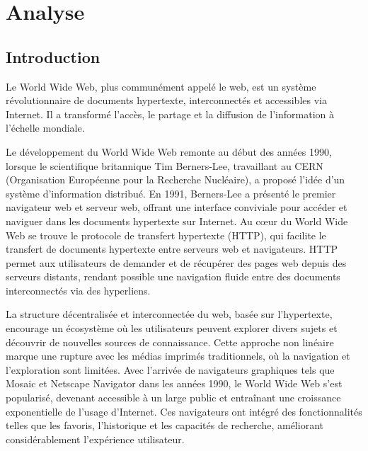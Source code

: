 \documentclass[a4paper,12pt]{article}
\begin{document}
\printbibliography

\section{Analyse}

\subsection{Introduction}
Le World Wide Web, plus communément appelé le web, est un système révolutionnaire de
documents hypertexte, interconnectés et accessibles via Internet. Il a transformé l'accès,
le partage et la diffusion de l'information à l'échelle mondiale.

Le développement du World Wide Web remonte au début des années 1990, lorsque le
scientifique britannique Tim Berners-Lee, travaillant au CERN (Organisation Européenne
pour la Recherche Nucléaire), a proposé l'idée d'un système d'information distribué. En
1991, Berners-Lee a présenté le premier navigateur web et serveur web, offrant une
interface conviviale pour accéder et naviguer dans les documents hypertexte sur Internet.
Au cœur du World Wide Web se trouve le protocole de transfert hypertexte (HTTP), qui
facilite le transfert de documents hypertexte entre serveurs web et navigateurs. HTTP
permet aux utilisateurs de demander et de récupérer des pages web depuis des serveurs
distants, rendant possible une navigation fluide entre des documents interconnectés via
des hyperliens.

La structure décentralisée et interconnectée du web, basée sur l'hypertexte, encourage un
écosystème où les utilisateurs peuvent explorer divers sujets et découvrir de nouvelles
sources de connaissance. Cette approche non linéaire marque une rupture avec les
médias imprimés traditionnels, où la navigation et l'exploration sont limitées.
Avec l'arrivée de navigateurs graphiques tels que Mosaic et Netscape Navigator dans les
années 1990, le World Wide Web s'est popularisé, devenant accessible à un large public
et entraînant une croissance exponentielle de l'usage d'Internet. Ces navigateurs ont
intégré des fonctionnalités telles que les favoris, l'historique et les capacités de recherche,
améliorant considérablement l'expérience utilisateur.
\end{document}
